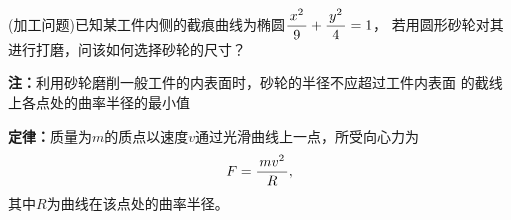 \begin{center}
\end{center}

\egz (加工问题)已知某工件内侧的截痕曲线为椭圆$\displaystyle\frac{\,{x^2}\,}{\,{9}\,}+\displaystyle\frac{\,{y^2}\,}{\,{4}\,}=1$，
若用圆形砂轮对其进行打磨，问该如何选择砂轮的尺寸？

{\bf 注：}利用砂轮磨削一般工件的内表面时，砂轮的半径不应超过工件内表面
的截线上各点处的曲率半径的最小值

{\bf 定律：}质量为$m$的质点以速度$v$通过光滑曲线上一点，所受向心力为
$$F=\displaystyle\frac{\,{mv^2}\,}{\,{R}\,},$$
其中$R$为曲线在该点处的曲率半径。

\begin{center}
\end{center}

